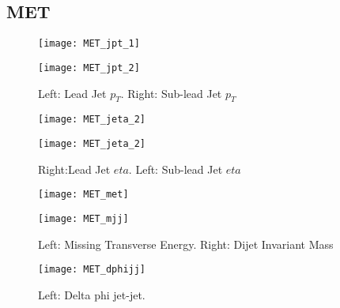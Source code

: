 \documentclass[a4paper,10pt]{article}
\begin{document}
\clearpage
\subsection{MET}
     
\begin{figure}[!h]
\centering
\begin{minipage}[!h]{0.4\linewidth}
\centering
\texttt{[image: MET\_jpt\_1]}
\end{minipage}%
\begin{minipage}[!h]{0.4\linewidth}
  \texttt{[image: MET\_jpt\_2]}
\end{minipage}
\caption{Left: Lead Jet $p_T$. Right: Sub-lead Jet $p_T$}
\end{figure}

\begin{figure}[!h]
\centering
\begin{minipage}[!h]{0.4\linewidth}
\centering
\texttt{[image: MET\_jeta\_2]}
\end{minipage}%
\begin{minipage}[!h]{0.4\linewidth}
\centering
\texttt{[image: MET\_jeta\_2]}
\end{minipage}
\caption{Right:Lead Jet $eta$. Left: Sub-lead Jet $eta$}
\end{figure}

\begin{figure}[!h]
\centering
\begin{minipage}[!h]{0.4\linewidth}
\centering
\texttt{[image: MET\_met]}
\end{minipage}%
\begin{minipage}[!h]{0.4\linewidth}
\centering
\texttt{[image: MET\_mjj]}
\end{minipage}
\caption{Left: Missing Transverse Energy. Right: Dijet Invariant Mass}
\end{figure}

\begin{figure}[!h]
\centering
\begin{minipage}[!h]{0.4\linewidth}
\centering
\texttt{[image: MET\_dphijj]}
\end{minipage}%
\begin{minipage}[!h]{0.4\linewidth}
\centering
\end{minipage}
\caption{Left: Delta phi jet-jet.}
\end{figure}
\end{document}
